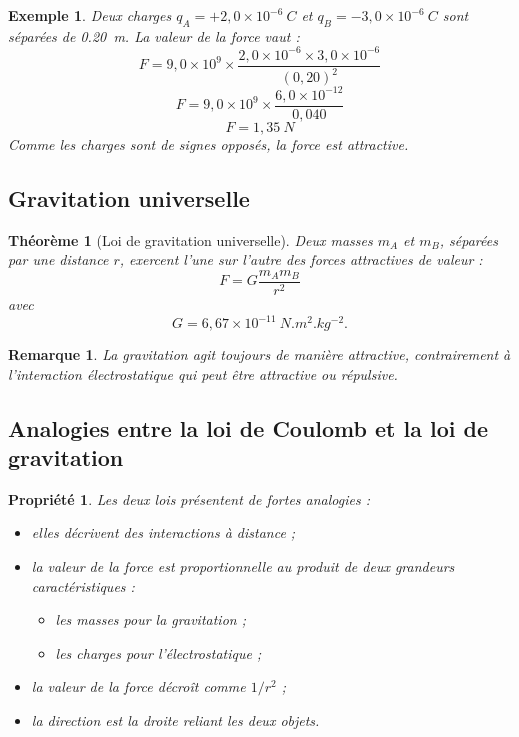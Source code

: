 \documentclass[11pt,a4paper]{article}
\newtheorem{propriete}{Propriété}[section]
\newtheorem{theoreme}{Théorème}[section]
\newtheorem{remarque}{Remarque}[section]
\newtheorem{exemple}{Exemple}[section]
\begin{document}
\begin{exemple}
Deux charges $q_A=+2,0\times 10^{-6}\ \si{C}$ et $q_B=-3,0\times 10^{-6}\ \si{C}$ sont séparées de \SI{0,20}{m}.  
La valeur de la force vaut :
\[
F = 9,0\times 10^9 \times \frac{2,0\times 10^{-6}\times 3,0\times 10^{-6}}{(0,20)^2}
\]
\[
F = 9,0\times 10^9 \times \frac{6,0\times 10^{-12}}{0,040}
\]
\[
F = 1,35\ \si{N}
\]
Comme les charges sont de signes opposés, la force est attractive.
\end{exemple}

\subsection{Gravitation universelle}

\begin{theoreme}[Loi de gravitation universelle]
Deux masses $m_A$ et $m_B$, séparées par une distance $r$, exercent l'une sur l'autre des forces attractives de valeur :
\[
F = G\frac{m_A m_B}{r^2}
\]
avec
\[
G=6,67\times 10^{-11}\ \si{N.m^2.kg^{-2}}.
\]
\end{theoreme}

\begin{remarque}
La gravitation agit toujours de manière attractive, contrairement à l'interaction électrostatique qui peut être attractive ou répulsive.
\end{remarque}

\subsection{Analogies entre la loi de Coulomb et la loi de gravitation}

\begin{propriete}
Les deux lois présentent de fortes analogies :
\begin{itemize}
    \item elles décrivent des interactions à distance ;
    \item la valeur de la force est proportionnelle au produit de deux grandeurs caractéristiques :
    \begin{itemize}
        \item les masses pour la gravitation ;
        \item les charges pour l'électrostatique ;
    \end{itemize}
    \item la valeur de la force décroît comme $1/r^2$ ;
    \item la direction est la droite reliant les deux objets.
\end{itemize}
\end{propriete}
\end{document}
